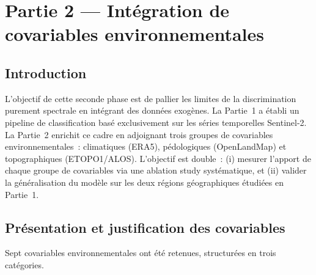 
\chapter{Partie 2 — Intégration de covariables environnementales}
\label{chap:partie2}

\section{Introduction}

L'objectif de cette seconde phase est de pallier les limites de la discrimination
purement spectrale en intégrant des données exogènes. La Partie~1 a établi un
pipeline de classification basé exclusivement sur les séries temporelles Sentinel-2.
La Partie~2 enrichit ce cadre en adjoignant trois groupes de covariables
environnementales~: climatiques (ERA5), pédologiques (OpenLandMap) et
topographiques (ETOPO1/ALOS). L'objectif est double~: (i) mesurer l'apport de
chaque groupe de covariables via une ablation study systématique, et (ii) valider
la généralisation du modèle sur les deux régions géographiques étudiées en Partie~1.

\section{Présentation et justification des covariables}

Sept covariables environnementales ont été retenues, structurées en trois catégories.

